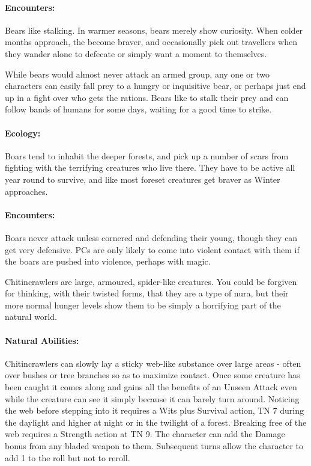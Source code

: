 \paragraph{Encounters:} Bears like stalking.  In warmer seasons, bears merely show curiosity.  When colder months approach, the become braver, and occasionally pick out travellers when they wander alone to defecate or simply want a moment to themselves.

While bears would almost never attack an armed group, any one or two characters can easily fall prey to a hungry or inquisitive bear, or perhaps just end up in a fight over who gets the rations.  Bears like to stalk their prey and can follow bands of humans for some days, waiting for a good time to strike.

\label{boar}
\boar

\paragraph{Ecology:} Boars tend to inhabit the deeper forests, and pick up a number of scars from fighting with the terrifying creatures who live there.  They have to be active all year round to survive, and like most foreset creatures get braver as Winter approaches.

\paragraph{Encounters:} Boars never attack unless cornered and defending their young, though they can get very defensive.  PCs are only likely to come into violent contact with them if the boars are pushed into violence, perhaps with magic.

\label{chitincrawler}
\chitincrawler

Chitincrawlers are large, armoured, spider-like creatures.  You could be forgiven for thinking, with their twisted forms, that they are a type of nura, but their more normal hunger levels show them to be simply a horrifying part of the natural world.

	\paragraph{Natural Abilities:} Chitincrawlers can slowly lay a sticky web-like substance over large areas - often over bushes or tree branches so as to maximize contact.  Once some creature has been caught it comes along and gains all the benefits of an Unseen Attack even while the creature can see it simply because it can barely turn around.  Noticing the web before stepping into it requires a Wits plus Survival action, TN 7 during the daylight and higher at night or in the twilight of a forest.  Breaking free of the web requires a Strength action at TN 9.  The character can add the Damage bonus from any bladed weapon to them.  Subsequent turns allow the character to add 1 to the roll but not to reroll.

